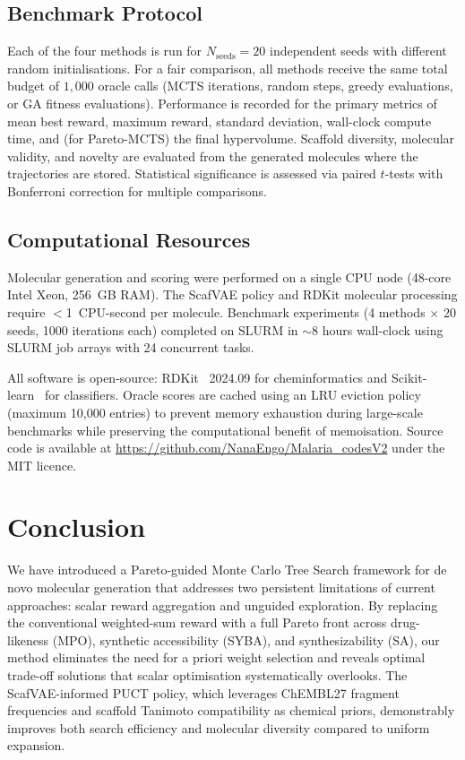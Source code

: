 \documentclass[jcim,article,layout=manuscript]{achemso}
\begin{document}
\subsection{Benchmark Protocol}
\label{sec:benchmark}

Each of the four methods is run for $N_\text{seeds}=20$ independent seeds
with different random initialisations. For a fair comparison, all methods
receive the same total budget of $1{,}000$ oracle calls (MCTS iterations,
random steps, greedy evaluations, or GA fitness evaluations). Performance is recorded for the primary metrics of mean best reward,
maximum reward, standard deviation, wall-clock compute time, and (for
Pareto-MCTS) the final hypervolume. Scaffold diversity, molecular
validity, and novelty are evaluated from the generated molecules where
the trajectories are stored. Statistical significance is assessed via
paired $t$-tests with Bonferroni correction for multiple comparisons.

\subsection{Computational Resources}
\label{sec:compute}

Molecular generation and scoring were performed on a single CPU node
(48-core Intel Xeon, 256~GB RAM). The ScafVAE policy and RDKit molecular
processing require $<$1~CPU-second per molecule. Benchmark experiments
(4 methods $\times$ 20 seeds, 1000 iterations each) completed on SLURM in $\sim$8 hours wall-clock
using SLURM job arrays with 24 concurrent tasks.

All software is open-source: RDKit~\cite{RDKit} 2024.09 for cheminformatics
and Scikit-learn~\cite{Pedregosa2011} for classifiers. Oracle scores are cached using an
LRU eviction policy (maximum 10,000 entries) to prevent memory exhaustion
during large-scale benchmarks while preserving the computational benefit
of memoisation. Source code is available at
\url{https://github.com/NanaEngo/Malaria_codesV2} under the MIT licence.

\section{Conclusion}

We have introduced a Pareto-guided Monte Carlo Tree Search framework for
de novo molecular generation that addresses two persistent limitations
of current approaches: scalar reward aggregation and unguided exploration. By replacing the
conventional weighted-sum reward with a full Pareto front across drug-likeness
(MPO), synthetic accessibility (SYBA), and synthesizability (SA), our method
eliminates the need for a priori weight selection and reveals optimal
trade-off solutions that scalar optimisation systematically overlooks. The
ScafVAE-informed PUCT policy, which leverages ChEMBL27 fragment frequencies
and scaffold Tanimoto compatibility as chemical priors, demonstrably improves
both search efficiency and molecular diversity compared to uniform expansion.
\end{document}
